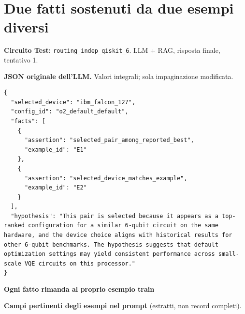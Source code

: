 \documentclass[a4paper,10pt]{article}
\begin{document}
\section*{Due fatti sostenuti da due esempi diversi}
\textbf{Circuito Test:} \texttt{routing\_indep\_qiskit\_6}. LLM + RAG, risposta finale, tentativo 1.\par
\textbf{JSON originale dell'LLM.} Valori integrali; sola impaginazione modificata.\par
\begin{lstlisting}
{
  "selected_device": "ibm_falcon_127",
  "config_id": "o2_default_default",
  "facts": [
    {
      "assertion": "selected_pair_among_reported_best",
      "example_id": "E1"
    },
    {
      "assertion": "selected_device_matches_example",
      "example_id": "E2"
    }
  ],
  "hypothesis": "This pair is selected because it appears as a top-ranked configuration for a similar 6-qubit circuit on the same hardware, and the device choice aligns with historical results for other 6-qubit benchmarks. The hypothesis suggests that default optimization settings may yield consistent performance across small-scale VQE circuits on this processor."
}
\end{lstlisting}

\textbf{Ogni fatto rimanda al proprio esempio train}
\begin{center}
\end{center}
\textbf{Campi pertinenti degli esempi nel prompt} (estratti, non record completi).
\end{document}
